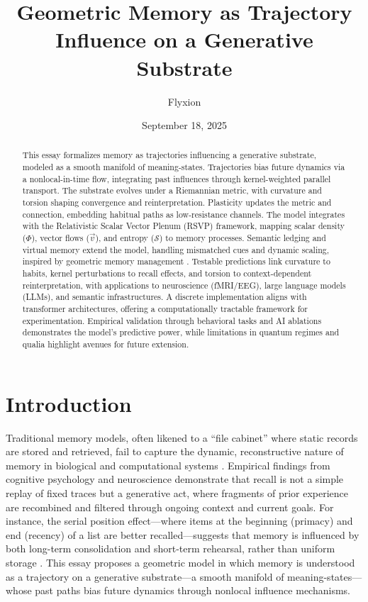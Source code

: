 \documentclass[a4paper,12pt]{article}
\newcommand{\Scal}{\mathcal{S}}
\newcommand{\vvec}{\vec{v}}
\begin{document}
\title{Geometric Memory as Trajectory Influence on a Generative Substrate}
\author{Flyxion}
\date{September 18, 2025}
\maketitle

\begin{abstract}
This essay formalizes memory as trajectories influencing a generative substrate, modeled as a smooth manifold of meaning-states. Trajectories bias future dynamics via a nonlocal-in-time flow, integrating past influences through kernel-weighted parallel transport. The substrate evolves under a Riemannian metric, with curvature and torsion shaping convergence and reinterpretation. Plasticity updates the metric and connection, embedding habitual paths as low-resistance channels. The model integrates with the Relativistic Scalar Vector Plenum (RSVP) framework, mapping scalar density ($\Phi$), vector flows ($\vvec$), and entropy ($\Scal$) to memory processes. Semantic ledging and virtual memory extend the model, handling mismatched cues and dynamic scaling, inspired by geometric memory management \citep{kuijper2021geometric}. Testable predictions link curvature to habits, kernel perturbations to recall effects, and torsion to context-dependent reinterpretation, with applications to neuroscience (fMRI/EEG), large language models (LLMs), and semantic infrastructures. A discrete implementation aligns with transformer architectures, offering a computationally tractable framework for experimentation. Empirical validation through behavioral tasks and AI ablations demonstrates the model's predictive power, while limitations in quantum regimes and qualia highlight avenues for future extension.
\end{abstract}

\tableofcontents

\section{Introduction}
Traditional memory models, often likened to a ``file cabinet'' where static records are stored and retrieved, fail to capture the dynamic, reconstructive nature of memory in biological and computational systems \citep{mcclelland1995why}. Empirical findings from cognitive psychology and neuroscience demonstrate that recall is not a simple replay of fixed traces but a generative act, where fragments of prior experience are recombined and filtered through ongoing context and current goals. For instance, the serial position effect—where items at the beginning (primacy) and end (recency) of a list are better recalled—suggests that memory is influenced by both long-term consolidation and short-term rehearsal, rather than uniform storage \citep{murdock1962serial}. This essay proposes a geometric model in which memory is understood as a trajectory on a generative substrate—a smooth manifold of meaning-states—whose past paths bias future dynamics through nonlocal influence mechanisms.
\end{document}
